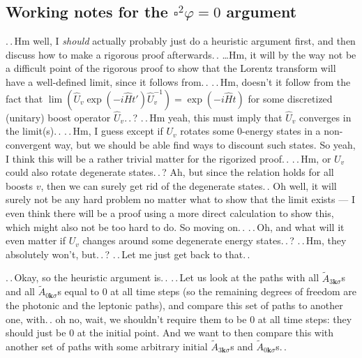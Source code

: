 \documentclass{report}
\begin{document}
\subsection[square2varphi]{Working notes for the $\square^2\varphi=0$ argument}
.\,.\,Hm well, I \emph{should} actually probably just do a heuristic argument first, and then discuss how to make a rigorous proof afterwards.\,. \ldots Hm, it will by the way not be a difficult point of the rigorous proof to show that the Lorentz transform will have a well-defined limit, since it follows from.\,. .\,.\,Hm, doesn't it follow from the fact that $\lim(\hat U_v\exp(-i \hat H t') \hat U_v^{-1}) = \exp(-i \hat H t)$ for some discretized (unitary) boost operator $\hat U_v$.\,.\,? .\,.\,Hm yeah, this must imply that $\hat U_v$ converges in the limit(s).\,. .\,.\,Hm, I guess except if $U_v$ rotates some 0-energy states in a non-convergent way, but we should be able find ways to discount such states. So yeah, I think this will be a rather trivial matter for the rigorized proof.\,. .\,.\,Hm, or $U_v$ could also rotate degenerate states.\,.\,? Ah, but since the relation holds for all boosts $v$, then we can surely get rid of the degenerate states.\,. Oh well, it will surely not be any hard problem no matter what to show that the limit exists --- I even think there will be a proof using a more direct calculation to show this, which might also not be too hard to do. So moving on.\,. .\,.\,Oh, and what will it even matter if $U_v$ changes around some degenerate energy states.\,.\,? .\,.\,Hm, they absolutely won't, but.\,.\,? .\,.\,Let me just get back to that.\,.

.\,.\,Okay, so the heuristic argument is.\,.  .\,.\,Let us look at the paths with all $\tilde A_{3\boldsymbol{k}\sigma}$s and all $\tilde A_{0\boldsymbol{k}\sigma}$s equal to 0 at all time steps (so the remaining degrees of freedom are the photonic and the leptonic paths), and compare this set of paths to another one, with.\,. oh no, wait, we shouldn't require them to be 0 at all time steps: they should just be 0 at the initial point. And we want to then compare this with another set of paths with some arbitrary initial $\tilde A_{3\boldsymbol{k}\sigma}$s and $\tilde A_{0\boldsymbol{k}\sigma}$s.\,. 
\end{document}
